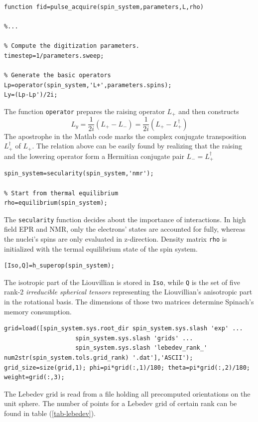 \documentclass[11.5pt,a4paper]{article}
\begin{document}
\begin{lstlisting}
function fid=pulse_acquire(spin_system,parameters,L,rho)

%...

% Compute the digitization parameters.
timestep=1/parameters.sweep;

% Generate the basic operators
Lp=operator(spin_system,'L+',parameters.spins);
Ly=(Lp-Lp')/2i;
\end{lstlisting}
The function \verb$operator$ prepares the raising operator $L_+$ and then constructs
\begin{equation}
  L_y = \frac{1}{2i} ( L_+ - L_- ) = \frac{1}{2i} ( L_+ - L_+^\dagger )
\end{equation}
The apostrophe in the Matlab code marks the complex conjugate transposition $L_+^\dagger$ of $L_+$. The relation above can be easily found by realizing that the raising and the lowering operator form a Hermitian conjugate pair $L_- = L_+^\dagger$

\begin{lstlisting}[firstnumber=last]
% Set the secularity assumptions
spin_system=secularity(spin_system,'nmr');

% Start from thermal equilibrium
rho=equilibrium(spin_system);
\end{lstlisting}
The \verb$secularity$ function decides about the importance of interactions. In high field EPR and NMR, only the electrons' states are accounted for fully, whereas the nuclei's spins are only evaluated in z-direction. Density matrix \verb$rho$ is initialized with the termal equilibrium state of the spin system.

\begin{lstlisting}[firstnumber=last]
[Iso,Q]=h_superop(spin_system);
\end{lstlisting}

The isotropic part of the Liouvillian is stored in \verb$Iso$, while \verb$Q$ is the set of five rank-2 \emph{irreducible spherical tensors} representing the Liouvillian's anisotropic part in the rotational basis. The dimensions of those two matrices determine Spinach's memory consumption.

\begin{lstlisting}[firstnumber=last]
% Get the spherical averaging grid
grid=load([spin_system.sys.root_dir spin_system.sys.slash 'exp' ...
				    spin_system.sys.slash 'grids' ...
				    spin_system.sys.slash 'lebedev_rank_' num2str(spin_system.tols.grid_rank) '.dat'],'ASCII');
grid_size=size(grid,1); phi=pi*grid(:,1)/180; theta=pi*grid(:,2)/180; weight=grid(:,3);
\end{lstlisting}
The Lebedev grid is read from a file holding all precomputed orientations on the unit sphere. The number of points for a Lebedev grid of certain rank can be found in table (\ref{tab-lebedev}).
\end{document}
